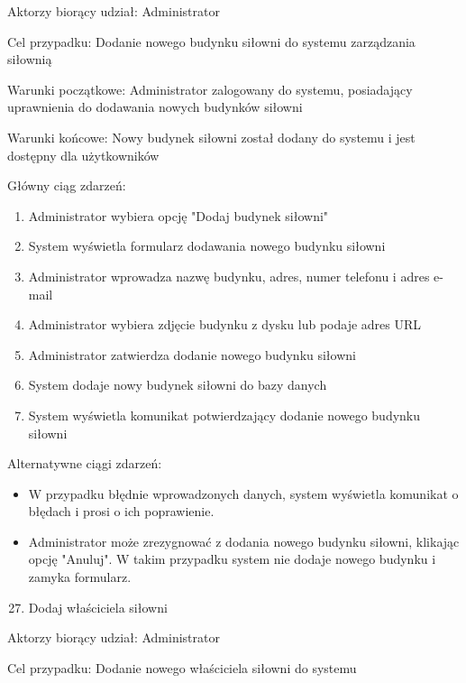 \documentclass[
]{article}
\providecommand{\tightlist}{%
  \setlength{\itemsep}{0pt}\setlength{\parskip}{0pt}}
\begin{document}
{Aktorzy biorący udział: Administrator}

{Cel przypadku: Dodanie nowego budynku siłowni do systemu zarządzania
siłownią}

{Warunki początkowe: Administrator zalogowany do systemu, posiadający
uprawnienia do dodawania nowych budynków siłowni}

{Warunki końcowe: Nowy budynek siłowni został dodany do systemu i jest
dostępny dla użytkowników}

{Główny ciąg zdarzeń:}

\begin{enumerate}
\tightlist
\item
  {Administrator wybiera opcję "Dodaj budynek siłowni"}
\item
  {System wyświetla formularz dodawania nowego budynku siłowni}
\item
  {Administrator wprowadza nazwę budynku, adres, numer telefonu i adres
  e-mail}
\item
  {Administrator wybiera zdjęcie budynku z dysku lub podaje adres URL}
\item
  {Administrator zatwierdza dodanie nowego budynku siłowni}
\item
  {System dodaje nowy budynek siłowni do bazy danych}
\item
  {System wyświetla komunikat potwierdzający dodanie nowego budynku
  siłowni}
\end{enumerate}

{Alternatywne ciągi zdarzeń:}

\begin{itemize}
\tightlist
\item
  {W przypadku błędnie wprowadzonych danych, system wyświetla komunikat
  o błędach i prosi o ich poprawienie.}
\item
  {Administrator może zrezygnować z dodania nowego budynku siłowni,
  klikając opcję "Anuluj". W takim przypadku system nie dodaje nowego
  budynku i zamyka formularz.}
\end{itemize}

{}

{}

\begin{enumerate}
\setcounter{enumi}{26}
\tightlist
\item
  {Dodaj właściciela siłowni}
\end{enumerate}

{Aktorzy biorący udział: Administrator}

{Cel przypadku: Dodanie nowego właściciela siłowni do systemu}
\end{document}
